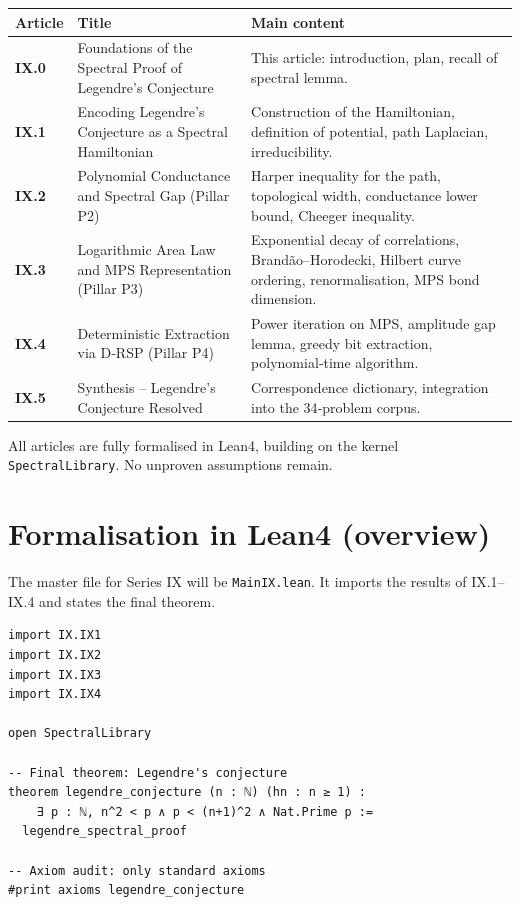 \documentclass[11pt,a4paper]{article}
\begin{document}
\begin{center}
\small
\begin{tabular}{@{}>{\bfseries}l>{\raggedright\arraybackslash}p{4.5cm}>{\raggedright\arraybackslash}p{6cm}@{}}
\toprule
\textbf{Article} & \textbf{Title} & \textbf{Main content} \\
\midrule
IX.0 & Foundations of the Spectral Proof of Legendre's Conjecture & This article: introduction, plan, recall of spectral lemma. \\
IX.1 & Encoding Legendre's Conjecture as a Spectral Hamiltonian & Construction of the Hamiltonian, definition of potential, path Laplacian, irreducibility. \\
IX.2 & Polynomial Conductance and Spectral Gap (Pillar P2) & Harper inequality for the path, topological width, conductance lower bound, Cheeger inequality. \\
IX.3 & Logarithmic Area Law and MPS Representation (Pillar P3) & Exponential decay of correlations, Brandão–Horodecki, Hilbert curve ordering, renormalisation, MPS bond dimension. \\
IX.4 & Deterministic Extraction via D‑RSP (Pillar P4) & Power iteration on MPS, amplitude gap lemma, greedy bit extraction, polynomial‑time algorithm. \\
IX.5 & Synthesis – Legendre's Conjecture Resolved & Correspondence dictionary, integration into the 34‑problem corpus. \\
\bottomrule
\end{tabular}
\normalsize
\end{center}

All articles are fully formalised in Lean4, building on the kernel \texttt{SpectralLibrary}. No unproven assumptions remain.

\section{Formalisation in Lean4 (overview)}

The master file for Series IX will be \texttt{MainIX.lean}. It imports the results of IX.1–IX.4 and states the final theorem.

\begin{lstlisting}[style=lean, caption={MainIX.lean (final)}]
import IX.IX1
import IX.IX2
import IX.IX3
import IX.IX4

open SpectralLibrary

-- Final theorem: Legendre's conjecture
theorem legendre_conjecture (n : ℕ) (hn : n ≥ 1) :
    ∃ p : ℕ, n^2 < p ∧ p < (n+1)^2 ∧ Nat.Prime p :=
  legendre_spectral_proof

-- Axiom audit: only standard axioms
#print axioms legendre_conjecture
\end{lstlisting}
\end{document}

